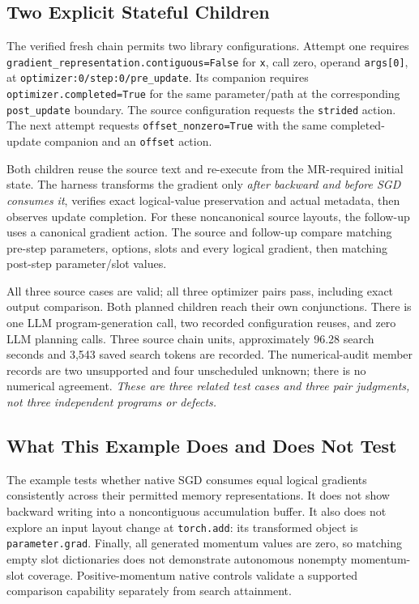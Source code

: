 \documentclass[conference]{IEEEtran}
\begin{document}
\subsection{Two Explicit Stateful Children}
The verified fresh chain permits two library configurations. Attempt one requires \texttt{gradient\_representation.contiguous=False} for \texttt{x}, call zero, operand \texttt{args[0]}, at \texttt{optimizer:0/step:0/pre\_update}. Its companion requires \texttt{optimizer.completed=True} for the same parameter/path at the corresponding \texttt{post\_update} boundary. The source configuration requests the \texttt{strided} action. The next attempt requests \texttt{offset\_nonzero=True} with the same completed-update companion and an \texttt{offset} action.

Both children reuse the source text and re-execute from the MR-required initial state. The harness transforms the gradient only \emph{after backward and before SGD consumes it}, verifies exact logical-value preservation and actual metadata, then observes update completion. For these noncanonical source layouts, the follow-up uses a canonical gradient action. The source and follow-up compare matching pre-step parameters, options, slots and every logical gradient, then matching post-step parameter/slot values.

All three source cases are valid; all three optimizer pairs pass, including exact output comparison. Both planned children reach their own conjunctions. There is one LLM program-generation call, two recorded configuration reuses, and zero LLM planning calls. Three source chain units, approximately 96.28 search seconds and 3,543 saved search tokens are recorded. The numerical-audit member records are two unsupported and four unscheduled unknown; there is no numerical agreement. \emph{These are three related test cases and three pair judgments, not three independent programs or defects.}

\subsection{What This Example Does and Does Not Test}
The example tests whether native SGD consumes equal logical gradients consistently across their permitted memory representations. It does not show backward writing into a noncontiguous accumulation buffer. It also does not explore an input layout change at \texttt{torch.add}: its transformed object is \texttt{parameter.grad}. Finally, all generated momentum values are zero, so matching empty slot dictionaries does not demonstrate autonomous nonempty momentum-slot coverage. Positive-momentum native controls validate a supported comparison capability separately from search attainment.
\end{document}
